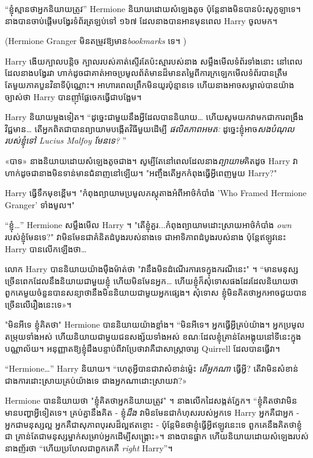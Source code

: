 {{{{{{“ខ្ញុំស្មានថាអ្នកនិយាយត្រូវ” Hermione និយាយដោយសំឡេងតូច ប៉ុន្តែនាងមិនបានប៉ះសូកូឡាទេ។ នាង​បាន​ចាប់​ផ្តើម​បង្វែរ​ទំព័រ​ត្រឡប់​ទៅ ១៦៧ ដែល​នាង​បាន​អាន​មុន​ពេល Harry ចូល​មក។

(Hermione Granger មិនតម្រូវឱ្យមាន\emph{bookmarks} ទេ។ )

Harry ងើយក្បាលបន្តិច ក្បាលរបស់គាត់ស្ទើរតែប៉ះស្មារបស់នាង សម្លឹងមើលទំព័រទាំងនោះ នៅពេលដែលនាងបង្វែរវា ហាក់ដូចជាគាត់អាចប្រមូលព័ត៌មានដ៏មានតម្លៃពីការក្រឡេកមើលទំព័របានត្រឹមតែមួយភាគបួនវិនាទីប៉ុណ្ណោះ។ អាហារពេលព្រឹកមិនយូរប៉ុន្មានទេ ហើយនាងអាចសម្គាល់បានយ៉ាងច្បាស់ថា Harry បានញ៉ាំផ្លែចេកធ្វើជាបង្អែម។

Harry និយាយម្តងទៀត។ “ដូច្នេះជាមួយនឹងអ្វីដែលបាននិយាយ… ហើយសូមយកវាមកជាការពង្រឹងវិជ្ជមាន… តើអ្នកពិតជាបានព្យាយាមបង្កើតវិធីមួយដើម្បី \emph{ ផលិតភាពអមតៈ} ដូច្នេះខ្ញុំអាច\emph{សងបំណុលរបស់ខ្ញុំទៅ Lucius Malfoy មែនទេ? }”

«បាទ» នាងនិយាយដោយសំឡេងតូចជាង។ សូម្បីតែនៅពេលដែលនាង\emph{ព្យាយាម}គិតដូច Harry វាហាក់ដូចជានាងមិនទាន់មានជំនាញនៅឡើយ។ "អញ្ចឹងតើអ្នកកំពុងធ្វើអ្វីពេញមួយ Harry?"

Harry ធ្វើ​ទឹក​មុខ​ខ្ពើម។ "កំពុងព្យាយាមប្រមូលភស្តុតាងអំពីអាថ៌កំបាំង 'Who Framed Hermione Granger' ទាំងមូល។"

“ខ្ញុំ…” Hermione សម្លឹងមើល Harry ។ "តើខ្ញុំគួរ...កំពុងព្យាយាមដោះស្រាយអាថ៌កំបាំង \emph{own} របស់ខ្ញុំមែនទេ?" វា​មិន​មែន​ជា​គំនិត​ដំបូង​របស់​នាង​ទេ ជា​អាទិភាព​ដំបូង​របស់​នាង ប៉ុន្តែ​ឥឡូវ​នេះ Harry បាន​លើក​ឡើង​ថា…

លោក Harry បាននិយាយយ៉ាងម៉ឺងម៉ាត់ថា "វានឹងមិនដំណើរការទេក្នុងករណីនេះ" ។ “មានមនុស្សច្រើនពេកដែលនឹងនិយាយជាមួយខ្ញុំ ហើយមិនមែនអ្នក… ហើយខ្ញុំក៏សុំទោសផងដែរដែលនិយាយថាពួកគេមួយចំនួនបានសន្យាថានឹងមិននិយាយជាមួយអ្នកផ្សេង។ សុំទោស ខ្ញុំមិនគិតថាអ្នកអាចជួយបានច្រើនលើរឿងនេះទេ»។

"មិនអីទេ ខ្ញុំគិតថា" Hermione បាននិយាយយ៉ាងខ្លាំង។ “មិនអីទេ។ អ្នកធ្វើអ្វីគ្រប់យ៉ាង។ អ្នកប្រមូលតម្រុយទាំងអស់ ហើយនិយាយជាមួយជនសង្ស័យទាំងអស់ ខណៈដែលខ្ញុំគ្រាន់តែអង្គុយនៅទីនេះក្នុងបណ្ណាល័យ។ អនុញ្ញាតឱ្យខ្ញុំដឹងបន្ទាប់ពីវាប្រែថាវាគឺជាសាស្រ្តាចារ្យ Quirrell ដែលបានធ្វើវា។

“Hermione…” Harry និយាយ។ “ហេតុអ្វីបានជាវាសំខាន់ម៉្លេះ \emph{តើអ្នកណា} ធ្វើអ្វី? តើ​វា​មិន​សំខាន់​ជាង​ការ​ដោះស្រាយ​គ្រប់​យ៉ាង​ទេ ជាង​អ្នក​ណា​ដោះស្រាយ​វា?»

Hermione បាននិយាយថា "ខ្ញុំគិតថាអ្នកនិយាយត្រូវ" ។ នាង​លើក​ដៃ​សង្កត់​ភ្នែក។ “ខ្ញុំគិតថាវាមិនមានបញ្ហាអ្វីទៀតទេ។ គ្រប់គ្នានឹងគិត - ខ្ញុំ\emph{ដឹង} វាមិនមែនជាកំហុសរបស់អ្នកទេ Harry អ្នកគឺជាអ្នក - អ្នកជាមនុស្សល្អ អ្នកគឺជាសុភាពបុរសដ៏ល្អឥតខ្ចោះ - ប៉ុន្តែមិនថាខ្ញុំធ្វើអ្វីឥឡូវនេះទេ ពួកគេនឹងគិតថាខ្ញុំជា គ្រាន់​តែ​ជា​មនុស្ស​ម្នាក់​សម្រាប់​អ្នក​ដើម្បី​សង្គ្រោះ​»។ នាង​បាន​ផ្អាក ហើយ​និយាយ​ដោយ​សំឡេង​របស់​នាង​ញ័រ​ថា “ហើយ​ប្រហែល​ជា​ពួកគេ​គឺ \emph{right} Harry”។

}}}}}}
